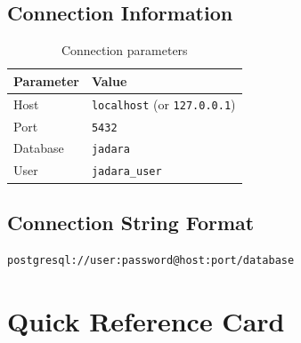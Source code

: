 \documentclass[11pt,a4paper]{article}
\begin{document}
\subsection{Connection Information}

\begin{table}[h]
\centering
\begin{tabular}{@{}ll@{}}
\toprule
\textbf{Parameter} & \textbf{Value} \\
\midrule
Host & \texttt{localhost} (or \texttt{127.0.0.1}) \\
Port & \texttt{5432} \\
Database & \texttt{jadara} \\
User & \texttt{jadara\_user} \\
\bottomrule
\end{tabular}
\caption{Connection parameters}
\end{table}

\subsection{Connection String Format}

\begin{lstlisting}
postgresql://user:password@host:port/database
\end{lstlisting}

\newpage
\section{Quick Reference Card}
\end{document}
